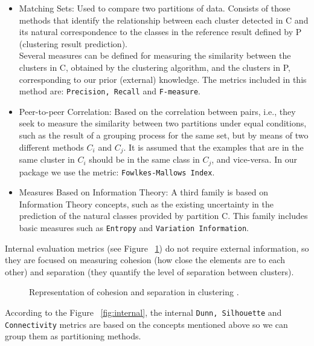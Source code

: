 \begin{itemize}
  \item Matching Sets: Used to compare two partitions of data. Consists of those methods that identify the relationship between each cluster detected in C and its natural correspondence to the classes in the reference result defined by P (clustering result prediction).\\
Several measures can be defined for measuring the similarity between the clusters in C, obtained by the clustering algorithm, and the clusters in P, corresponding to our prior (external) knowledge. The metrics included in this method are: \texttt{Precision, Recall} and \texttt{F-measure}.
  \item Peer-to-peer Correlation: Based on the correlation between pairs, i.e., they seek to measure the similarity between two partitions under equal conditions, such as the result of a grouping process for the same set, but by means of two different methods $ C_{i} $ and $ C_{j} $. It is assumed that the examples that are in the same cluster in $ C_{i} $ should be in the same class in $ C_{j} $, and vice-versa. In our package we use the metric: \texttt{Fowlkes-Mallows Index}.
  \item Measures Based on Information Theory: A third family is based on Information Theory concepts, such as the existing uncertainty in the prediction of the natural classes provided by partition C. This family includes basic measures such as \texttt{Entropy} and \texttt{Variation Information}.
\end{itemize}
Internal evaluation metrics (see Figure ~\ref{fig:cohesion}) do not require external information, so they are focused on measuring cohesion (how close the elements are to each other) and separation (they quantify the level of separation between clusters).
\begin{figure}[htbp]
  \centering
    \caption{Representation of cohesion and separation in clustering \citep{b54}.}%
    \label{fig:cohesion}%
\end{figure}

According to the Figure ~\ref{fig:internal}, the internal \texttt{Dunn, Silhouette} and \texttt{Connectivity} metrics are based on the concepts mentioned above so we can group them as partitioning methods.

